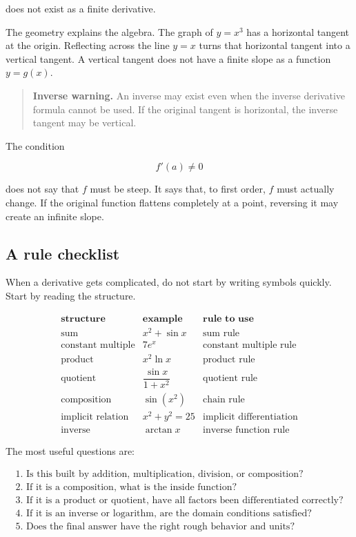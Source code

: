 does not exist as a finite derivative.

The geometry explains the algebra.  The graph of \(y=x^3\) has a horizontal tangent at the origin.  Reflecting across the line \(y=x\) turns that horizontal tangent into a vertical tangent.  A vertical tangent does not have a finite slope as a function \(y=g(x)\).

\begin{quote}
\textbf{Inverse warning.}
An inverse may exist even when the inverse derivative formula cannot be used.  If the original tangent is horizontal, the inverse tangent may be vertical.
\end{quote}

The condition

\[
f'(a)\neq0
\]

does not say that \(f\) must be steep.  It says that, to first order, \(f\) must actually change.  If the original function flattens completely at a point, reversing it may create an infinite slope.

\subsection{A rule checklist}
\label{subsec:derivative-rule-checklist}

When a derivative gets complicated, do not start by writing symbols quickly.  Start by reading the structure.

\[
\begin{array}{c|c|c}
\textbf{structure} & \textbf{example} & \textbf{rule to use} \\ \hline
\text{sum} & x^2+\sin x & \text{sum rule} \\[2pt]
\text{constant multiple} & 7e^x & \text{constant multiple rule} \\[2pt]
\text{product} & x^2\ln x & \text{product rule} \\[2pt]
\text{quotient} & \dfrac{\sin x}{1+x^2} & \text{quotient rule} \\[10pt]
\text{composition} & \sin(x^2) & \text{chain rule} \\[2pt]
\text{implicit relation} & x^2+y^2=25 & \text{implicit differentiation} \\[2pt]
\text{inverse} & \arctan x & \text{inverse function rule}
\end{array}
\]

The most useful questions are:

\[
\begin{array}{l}
\text{1. Is this built by addition, multiplication, division, or composition?}\\
\text{2. If it is a composition, what is the inside function?}\\
\text{3. If it is a product or quotient, have all factors been differentiated correctly?}\\
\text{4. If it is an inverse or logarithm, are the domain conditions satisfied?}\\
\text{5. Does the final answer have the right rough behavior and units?}
\end{array}
\]

